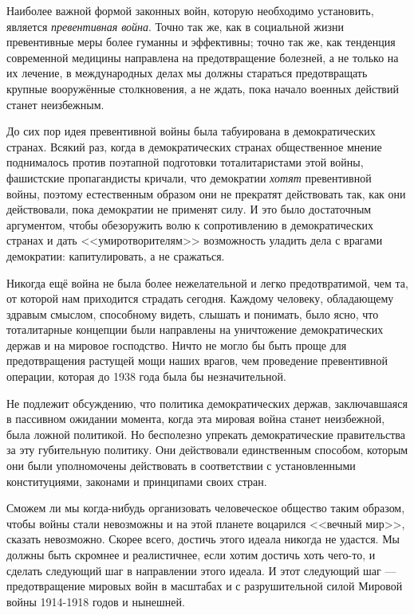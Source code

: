 Наиболее важной формой законных войн, которую необходимо установить, является \textit{превентивная война}. Точно так же, как в социальной жизни превентивные меры более гуманны и эффективны; точно так же, как тенденция современной медицины направлена на предотвращение болезней, а не только на их лечение, в международных делах мы должны стараться предотвращать крупные вооружённые столкновения, а не ждать, пока начало военных действий станет неизбежным.

До сих пор идея превентивной войны была табуирована в демократических странах. Всякий раз, когда в демократических странах общественное мнение поднималось против поэтапной подготовки тоталитаристами этой войны, фашистские пропагандисты кричали, что демократии \textit{хотят} превентивной войны, поэтому естественным образом они не прекратят действовать так, как они действовали, пока демократии не применят силу. И это было достаточным аргументом, чтобы обезоружить волю к сопротивлению в демократических странах и дать <<умиротворителям>> возможность уладить дела с врагами демократии: капитулировать, а не сражаться.

Никогда ещё война не была более нежелательной и легко предотвратимой, чем та, от которой нам приходится страдать сегодня. Каждому человеку, обладающему здравым смыслом, способному видеть, слышать и понимать, было ясно, что тоталитарные концепции были направлены на уничтожение демократических держав и на мировое господство. Ничто не могло бы быть проще для предотвращения растущей мощи наших врагов, чем проведение превентивной операции, которая до 1938 года была бы незначительной.

Не подлежит обсуждению, что политика демократических держав, заключавшаяся в пассивном ожидании момента, когда эта мировая война станет неизбежной, была ложной политикой. Но бесполезно упрекать демократические правительства за эту губительную политику. Они действовали единственным способом, которым они были уполномочены действовать в соответствии с установленными конституциями, законами и принципами своих стран.

Сможем ли мы когда-нибудь организовать человеческое общество таким образом, чтобы войны стали невозможны и на этой планете воцарился <<вечный мир>>, сказать невозможно. Скорее всего, достичь этого идеала никогда не удастся. Мы должны быть скромнее и реалистичнее, если хотим достичь хоть чего-то, и сделать следующий шаг в направлении этого идеала. И этот следующий шаг — предотвращение мировых войн в масштабах и с разрушительной силой Мировой войны 1914-1918 годов и нынешней.

